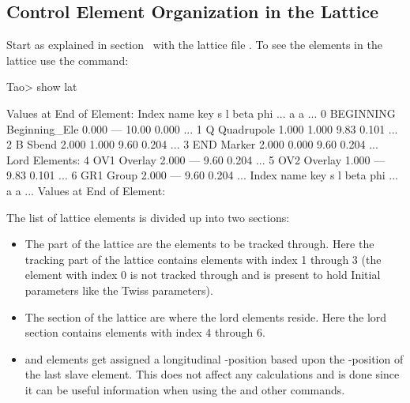 \documentclass{hitec}     %
\begin{document}
{%
\subsection{Control Element Organization in the Lattice}

Start \tao as explained in section~ with the lattice file . To
see the elements in the lattice use the  command:
\begin{code}
Tao> show lat

      Values at End of Element:
 Index  name      key                       s       l    beta     phi ...
                                                            a       a ...
     0  BEGINNING Beginning_Ele         0.000     ---   10.00   0.000 ...
     1  Q         Quadrupole            1.000   1.000    9.83   0.101 ...
     2  B         Sbend                 2.000   1.000    9.60   0.204 ...
     3  END       Marker                2.000   0.000    9.60   0.204 ...
Lord Elements:
     4  OV1       Overlay               2.000     ---    9.60   0.204 ...
     5  OV2       Overlay               1.000     ---    9.83   0.101 ...
     6  GR1       Group                 2.000     ---    9.60   0.204 ...
 Index  name      key                       s       l    beta     phi ...
                                                            a       a ...
      Values at End of Element:
\end{code}

The list of lattice elements is divided up into two sections:
\vspace{-5 pt}
\begin{itemize}
\item
The  part of the lattice are the elements to be tracked through. Here the tracking
part of the lattice contains elements with index 1 through 3 (the  element with index
0 is not tracked through and is present to hold Initial parameters like the Twiss parameters).
%
\item
The  section of the lattice are where the lord elements reside.  Here the lord section contains
elements with index 4 through 6.
%
\item
{} and  elements get assigned a longitudinal -position based upon the
-position of the last slave element. This does not affect any calculations and is done since it
can be useful information when using the  and other  commands.
\end{itemize}

}
\end{document}
